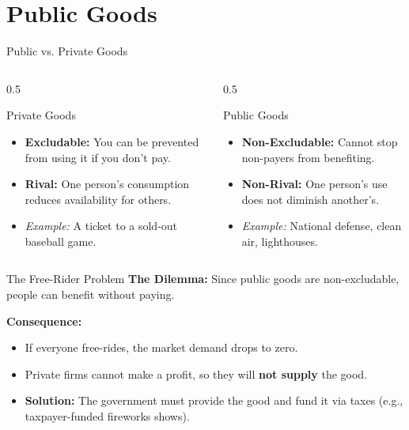 \documentclass{beamer}
\begin{document}
\section{Public Goods}

\begin{frame}{Public vs. Private Goods}
    \begin{columns}
        \begin{column}{0.5\textwidth}
            \begin{block}{Private Goods}
                \begin{itemize}
                    \item \textbf{Excludable:} You can be prevented from using it if you don't pay.
                    \item \textbf{Rival:} One person's consumption reduces availability for others.
                    \item \textit{Example:} A ticket to a sold-out baseball game.
                \end{itemize}
            \end{block}
        \end{column}
        \begin{column}{0.5\textwidth}
            \begin{block}{Public Goods}
                \begin{itemize}
                    \item \textbf{Non-Excludable:} Cannot stop non-payers from benefiting.
                    \item \textbf{Non-Rival:} One person's use does not diminish another's.
                    \item \textit{Example:} National defense, clean air, lighthouses.
                \end{itemize}
            \end{block}
        \end{column}
    \end{columns}
\end{frame}

\begin{frame}{The Free-Rider Problem}
    \textbf{The Dilemma:}
    Since public goods are non-excludable, people can benefit without paying.
    
    \vspace{0.5cm}
    \textbf{Consequence:}
    \begin{itemize}
        \item If everyone free-rides, the market demand drops to zero.
        \item Private firms cannot make a profit, so they will \textbf{not supply} the good.
        \item \textbf{Solution:} The government must provide the good and fund it via taxes (e.g., taxpayer-funded fireworks shows).
    \end{itemize}
\end{frame}
\end{document}
